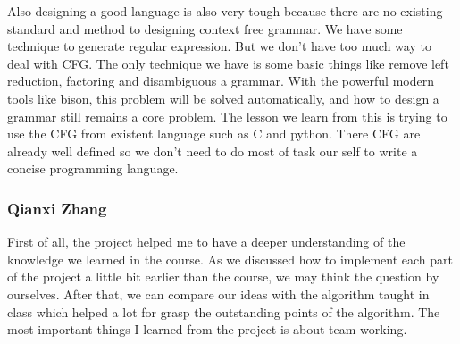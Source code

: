 Also designing a good language is also very tough because there are no existing standard and method
to designing context free grammar. We have some technique to generate regular expression. But we
don’t have too much way to deal with CFG. The only technique we have is some basic things like
remove left reduction, factoring and disambiguous a grammar. With the powerful modern tools like
bison, this problem will be solved automatically, and how to design a grammar still remains a core
problem. The lesson we learn from this is trying to use the CFG from existent language such as C and
python. There CFG are already well defined so we don’t need to do most of task our self to write a
concise programming language.

\subsubsection{Qianxi Zhang}

First of all, the project helped me to have a deeper understanding of the knowledge we learned in
the course. As we discussed how to implement each part of the project a little bit earlier than the
course, we may think the question by ourselves. After that, we can compare our ideas with the
algorithm taught in class which helped a lot for grasp the outstanding points of the algorithm.
The most important things I learned from the project is about team working.

